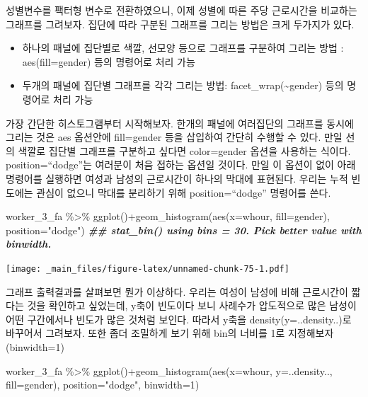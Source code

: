 \documentclass[
]{book}
\newenvironment{Shaded}{\begin{snugshade}}{\end{snugshade}}
\newcommand{\AttributeTok}[1]{\textcolor[rgb]{0.77,0.63,0.00}{#1}}
\newcommand{\DecValTok}[1]{\textcolor[rgb]{0.00,0.00,0.81}{#1}}
\newcommand{\DocumentationTok}[1]{\textcolor[rgb]{0.56,0.35,0.01}{\textbf{\textit{#1}}}}
\newcommand{\FunctionTok}[1]{\textcolor[rgb]{0.00,0.00,0.00}{#1}}
\newcommand{\NormalTok}[1]{#1}
\newcommand{\SpecialCharTok}[1]{\textcolor[rgb]{0.00,0.00,0.00}{#1}}
\newcommand{\StringTok}[1]{\textcolor[rgb]{0.31,0.60,0.02}{#1}}
\theoremstyle{definition}
\theoremstyle{definition}
\theoremstyle{definition}
\theoremstyle{definition}
\theoremstyle{remark}
\begin{document}
성별변수를 팩터형 변수로 전환하였으니, 이제 성별에 따른 주당 근로시간을 비교하는 그래프를 그려보자. 집단에 따라 구분된 그래프를 그리는 방법은 크게 두가지가 있다.

\begin{itemize}
\item
  하나의 패널에 집단별로 색깔, 선모양 등으로 그래프를 구분하여 그리는 방법 : aes(fill=gender) 등의 명령어로 처리 가능
\item
  두개의 패널에 집단별 그래프를 각각 그리는 방법: facet\_wrap(\textasciitilde gender) 등의 명령어로 처리 가능
\end{itemize}

가장 간단한 히스토그램부터 시작해보자. 한개의 패널에 여러집단의 그래프를 동시에 그리는 것은 aes 옵션안에 fill=gender 등을 삽입하여 간단히 수행할 수 있다. 만일 선의 색깔로 집단별 그래프를 구분하고 싶다면 color=gender 옵션을 사용하는 식이다. position=``dodge''는 여러분이 처음 접하는 옵션일 것이다. 만일 이 옵션이 없이 아래 명령어를 실행하면 여성과 남성의 근로시간이 하나의 막대에 표현된다. 우리는 누적 빈도에는 관심이 없으니 막대를 분리하기 위해 position=``dodge'' 명령어를 쓴다.

\begin{Shaded}
\begin{Highlighting}[]
\NormalTok{worker\_3\_fa }\SpecialCharTok{\%\textgreater{}\%} 
  \FunctionTok{ggplot}\NormalTok{()}\SpecialCharTok{+}\FunctionTok{geom\_histogram}\NormalTok{(}\FunctionTok{aes}\NormalTok{(}\AttributeTok{x=}\NormalTok{whour, }\AttributeTok{fill=}\NormalTok{gender), }\AttributeTok{position=}\StringTok{"dodge"}\NormalTok{)}
\DocumentationTok{\#\# \textasciigrave{}stat\_bin()\textasciigrave{} using \textasciigrave{}bins = 30\textasciigrave{}. Pick better value with \textasciigrave{}binwidth\textasciigrave{}.}
\end{Highlighting}
\end{Shaded}

\texttt{[image: \_main\_files/figure-latex/unnamed-chunk-75-1.pdf]}

그래프 출력결과를 살펴보면 뭔가 이상하다. 우리는 여성이 남성에 비해 근로시간이 짧다는 것을 확인하고 싶었는데, y축이 빈도이다 보니 사례수가 압도적으로 많은 남성이 어떤 구간에서나 빈도가 많은 것처럼 보인다. 따라서 y축을 density(y=..density..)로 바꾸어서 그려보자. 또한 좀더 조밀하게 보기 위해 bin의 너비를 1로 지정해보자(binwidth=1)

\begin{Shaded}
\begin{Highlighting}[]
\NormalTok{worker\_3\_fa }\SpecialCharTok{\%\textgreater{}\%} 
  \FunctionTok{ggplot}\NormalTok{()}\SpecialCharTok{+}\FunctionTok{geom\_histogram}\NormalTok{(}\FunctionTok{aes}\NormalTok{(}\AttributeTok{x=}\NormalTok{whour, }\AttributeTok{y=}\NormalTok{..density.., }\AttributeTok{fill=}\NormalTok{gender), }\AttributeTok{position=}\StringTok{"dodge"}\NormalTok{, }\AttributeTok{binwidth=}\DecValTok{1}\NormalTok{)}
\end{Highlighting}
\end{Shaded}
\end{document}
